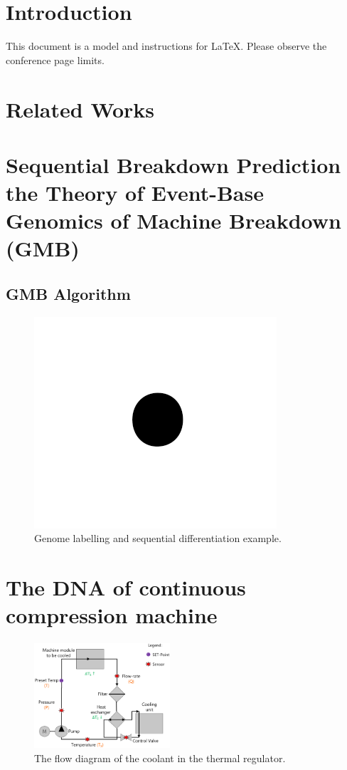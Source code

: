 \documentclass[conference]{IEEEtran}
\begin{document}
\section{Introduction}
\label{sec:Introduction}
This document is a model and instructions for \LaTeX.
Please observe the conference page limits.

\section{Related Works}
\label{sec:Related_works}


\section{Sequential Breakdown Prediction the Theory of Event-Base Genomics of Machine Breakdown (GMB)}
\label{sec:GMB}


\subsection{GMB Algorithm}
\label{subsec:GMB_Algorithm}

\begin{figure}[htbp]
\centerline{\includegraphics{fig1.png}}
\caption{Genome labelling and sequential differentiation example.}
\label{fig:Genome_labelling}
\end{figure}

\section{The DNA of continuous compression machine}
\label{sec:DNA_CCM}

\begin{figure}[htbp]
\centerline{\includegraphics[width=0.45\textwidth]{TH_schematic.png}}
\caption{The flow diagram of the coolant in the thermal regulator.}
\label{fig:TH_schematic}
\end{figure}
\end{document}
